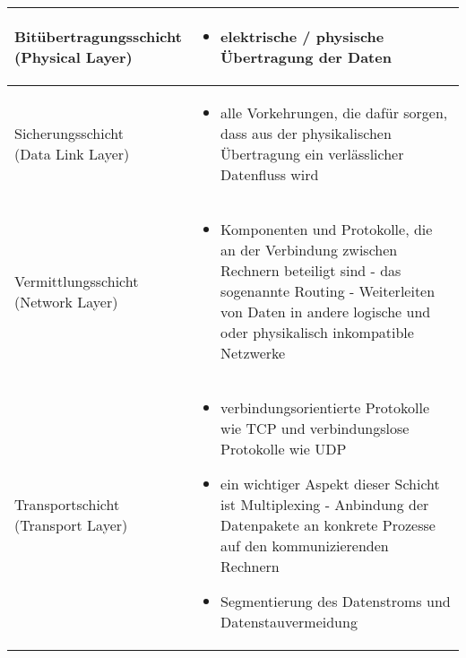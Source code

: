 \renewcommand{\tabcolsep}{1pt}
\begin{longtable}{@{}p{}@{\hspace{3em}}p{}}
    \\\hline
    \makecell[l]{Bitübertragungsschicht \\ (Physical Layer)}
        & 
        \begin{itemize}
            \item elektrische / physische Übertragung der Daten 
        \end{itemize}
        
    \\\hline

    \makecell[l]{Sicherungsschicht \\ (Data Link Layer)}
        &
        \begin{itemize}
            \item alle Vorkehrungen, die dafür sorgen, dass aus der physikalischen Übertragung ein verlässlicher Datenfluss wird
        
        \end{itemize}
    \\\hline
    
    \makecell[l]{Vermittlungsschicht \\ (Network Layer)}
        &
        \begin{itemize}
            \item Komponenten und Protokolle, die an der Verbindung zwischen Rechnern beteiligt sind - das sogenannte Routing - Weiterleiten von Daten in andere logische und oder physikalisch inkompatible Netzwerke
        \end{itemize}
    \\\hline
    
    \makecell[l]{Transportschicht \\ (Transport Layer)}
        &
        \begin{itemize}
            \item verbindungsorientierte Protokolle wie TCP und verbindungslose Protokolle wie UDP
            \item ein wichtiger Aspekt dieser Schicht ist Multiplexing - Anbindung der Datenpakete an konkrete Prozesse auf den kommunizierenden Rechnern 
            \item Segmentierung des Datenstroms und Datenstauvermeidung
        \end{itemize}
    \\\hline


\end{longtable}

